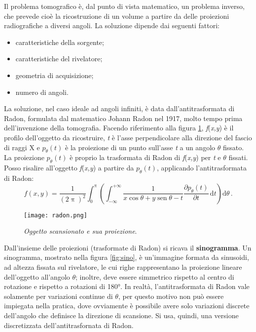 \documentclass{report}
\newcommand{\figref}[1]{figura \ref{#1}}
\numberwithin{equation}{section}
\numberwithin{figure}{section}
\DeclareMathOperator{\sen}{sen}
\begin{document}
Il problema tomografico è, dal punto di vista matematico, un problema inverso, che prevede cioè la ricostruzione di un volume a partire da delle proiezioni radiografiche a diversi angoli. La soluzione dipende dai seguenti fattori:
\begin{itemize}[label=$-$]
    \item caratteristiche della sorgente;
    \item caratteristiche del rivelatore;
    \item geometria di acquisizione;
    \item numero di angoli.
\end{itemize}
La soluzione, nel caso ideale ad angoli infiniti, è data dall'antitrasformata di Radon, formulata dal matematico Johann Radon nel 1917, molto tempo prima dell'invenzione della tomografia. Facendo riferimento alla \figref{fig:radon}, \textit{f}(\textit{x,y}) è il profilo dell'oggetto da ricostruire, \textit{t} è l'asse perpendicolare alla direzione del fascio di raggi X e $p_\theta(t)$ è la proiezione di un punto sull'asse \textit{t} a un angolo $\theta$ fissato. La proiezione $p_\theta(t)$ è proprio la trasformata di Radon di \textit{f}(\textit{x,y}) per \textit{t} e $\theta$ fissati. Posso risalire all'oggetto \textit{f}(\textit{x,y}) a partire da $p_\theta(t)$, applicando l'antitrasformata di Radon:
\begin{equation}\label{radon}
    f(x,y) = \frac{1}{(2\uppi)^2} \int_0^\uppi \left( \int_{-\infty}^{+\infty} \frac{1}{x\cos{\theta}+y\sen{\theta}-t} \frac{\partial p_\theta(t)}{\partial t}\, \mathrm{d}t \right) \mathrm{d}\theta \,.
\end{equation}

\begin{figure}[htp]
\centering
\texttt{[image: radon.png]}
\caption{\label{fig:radon} \textit{Oggetto scansionato e sua proiezione}.}
\end{figure}

Dall'insieme delle proiezioni (trasformate di Radon) si ricava il \textbf{sinogramma}. Un sinogramma, mostrato nella \figref{fig:sino}, è un’immagine formata da sinusoidi, ad altezza fissata sul rivelatore, le cui righe rappresentano la proiezione lineare dell'oggetto all'angolo $\theta$; inoltre, deve essere simmetrico rispetto al centro di rotazione e rispetto a rotazioni di 180°. In realtà, l'antitrasformata di Radon vale solamente per variazioni continue di $\theta$, per questo motivo non può essere impiegata nella pratica, dove ovviamente è possibile avere solo variazioni discrete dell'angolo che definisce la direzione di scansione. Si usa, quindi, una versione discretizzata dell'antitrasfornata di Radon.
\end{document}
